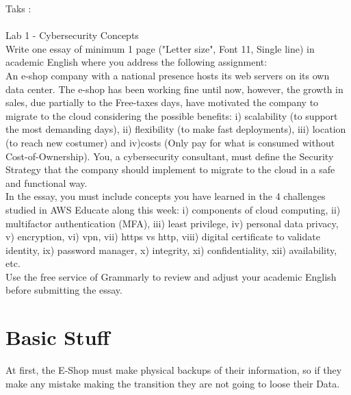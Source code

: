 \documentclass[10pt,a4paper]{article} %
\begin{document}
    \title{\rmfamily\normalfont{}}
    \author{}
    \date{\today} 
    
    \maketitle
     

        Taks : 
        \\ 
        \\ 
        Lab 1 - Cybersecurity Concepts
        \\
        Write one essay of minimum 1 page ("Letter size", Font 11, Single line) in
        academic English where you address the following assignment:
        \\
        An e-shop company with a national presence hosts its web servers on its own
        data center. The e-shop has been working fine until now, however, the
        growth in sales, due partially to the Free-taxes days, have motivated the
        company to migrate to the cloud considering the possible benefits: i)
        scalability (to support the most demanding days), ii) flexibility (to make
        fast deployments), iii) location (to reach new costumer) and iv)costs (Only
        pay for what is consumed without Cost-of-Ownership). You, a cybersecurity
        consultant, must define the Security Strategy that the company should
        implement to migrate to the cloud in a safe and functional way.
        \\
        In the essay, you must include concepts you have learned in the 4 challenges
        studied in AWS Educate along this week: i) components of cloud computing, ii)
        multifactor authentication (MFA), iii) least privilege, iv) personal data
        privacy, v) encryption, vi) vpn, vii) https vs http, viii) digital certificate
        to validate identity, ix) password manager, x) integrity, xi) confidentiality,
        xii) availability, etc.
        \\
        Use the free service of Grammarly to review and adjust your academic
        English before submitting the essay.
    \section{Basic Stuff}
        At first, the E-Shop must make physical backups of their information,
        so if they make any mistake making the transition they are not going to
        loose their Data. 
\end{document}
